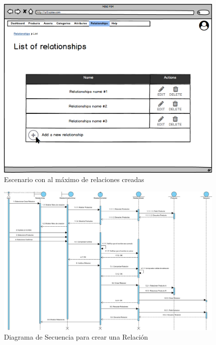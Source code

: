 \begin{figure}[H]
    \includegraphics[width=1\linewidth]{assets/mockups/RF5.1_3.png}
    \caption{Escenario con al máximo de relaciones creadas}
   \end{figure}
\vspace{1.0cm}

\newpage %

\begin{figure}[H]
    \includegraphics[width=1\linewidth]{assets/sequence/Crear.jpg}
    \caption{Diagrama de Secuencia para crear una Relación}
   \end{figure}
\vspace{1.0cm}

\newpage %